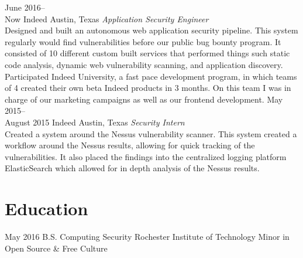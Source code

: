 \documentclass[]{CalebCoffie-CV-Class} %
\begin{document}
\begin{entrylist}
\entry
{June 2016--\\Now}
{Indeed}
{Austin, Texas}
{\emph{Application Security Engineer} \\
Designed and built an autonomous web application security pipeline. This system regularly would find vulnerabilities before our public bug bounty program. It consisted of 10 different custom built services that performed things such static code analysis, dynamic web vulnerability scanning, and application discovery. \\

Participated Indeed University, a fast pace development program, in which teams of 4 created their own beta Indeed products in 3 months. On this team I was in charge of our marketing campaigns as well as our frontend development.}
\entry
{May 2015--\\August 2015}
{Indeed}
{Austin, Texas}
{\emph{Security Intern} \\
Created a system around the Nessus vulnerability scanner. This system created a workflow around the Nessus results, allowing for quick tracking of the vulnerabilities. It also placed the findings into the centralized logging platform ElasticSearch which allowed for in depth analysis of the Nessus results.}
\end{entrylist}


\section{Education}

\begin{entrylist}
\entry
{May 2016}
{B.S. {\normalfont Computing Security}}
{Rochester Institute of Technology}
{Minor in Open Source \& Free Culture}
\end{entrylist}

\end{document}
